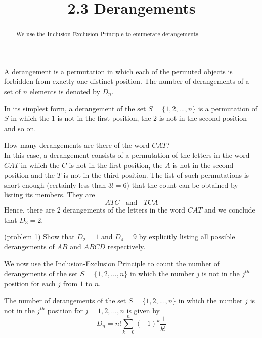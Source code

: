 \documentclass[handout]{ximera}
\title{2.3 Derangements}
\begin{document}
\begin{abstract}
We use the Inclusion-Exclusion Principle to enumerate derangements.
\end{abstract}

\maketitle



\begin{definition}[Derangements]
A derangement is a permutation in which each of the permuted objects is forbidden from exactly one distinct position.
The number of derangements of a set of $n$ elements is denoted by $D_n$.
\end{definition}

\begin{remark}
In its simplest form, a derangement of the set $S = \{1, 2, ..., n\}$ is a permutation of $S$ in 
which the $1$ is not in the first position, the $2$ is not in the second position and so on.
\end{remark}

\begin{example}
How many derangements are there of the word $CAT$?\\
In this case, a derangement consists of a permutation of the letters in the word $CAT$ in 
which the $C$ is not in the first position, the $A$ is not in the second position 
and the $T$ is not in the third position. The list of such permutations is short 
enough (certainly less than $3! = 6$) that the count can be 
obtained by listing its members.  They are
\[
ATC \;\;\text{  and  } \;\;TCA
\]
Hence, there are $2$ derangements of the letters in the word $CAT$ and we conclude that $D_3 =2$.  
\end{example}

\begin{problem}(problem 1)
Show that $D_2 = 1$ and $D_4 = 9$ by explicitly listing all possible derangements of $AB$ and $ABCD$ respectively.
\end{problem}

We now use the Inclusion-Exclusion Principle to count the number of derangements of the set $S = \{1, 2, ..., n\}$
in which the number $j$ is not in the $j^{th}$ position for each $j$ from $1$ to $n$.

\begin{theorem}[Derangements]
The number of derangements of the set $S = \{1, 2, ..., n\}$
in which the number $j$ is not in the $j^{th}$ position for $j = 1, 2, ..., n$ is given by
\[
D_n = n!\sum_{k = 0}^n (-1)^k \frac{1}{k!}
\]
\end{theorem}
\end{document}
